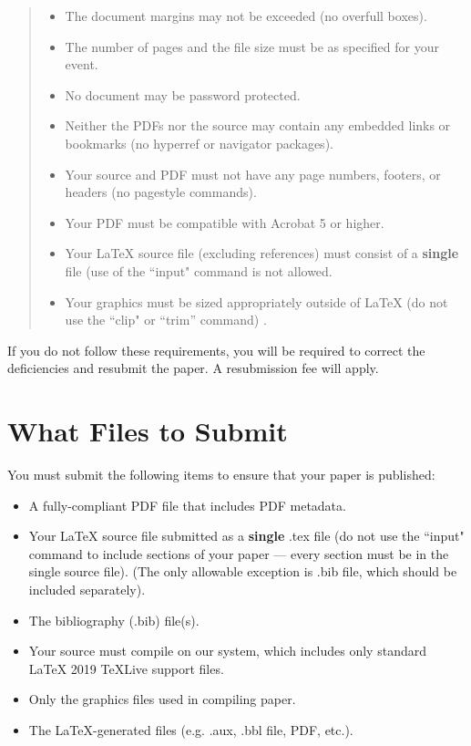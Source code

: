 \documentclass[letterpaper]{article} %
\begin{document}
\begin{quote}
\begin{itemize}
\item The document margins may not be exceeded (no overfull boxes).
\item The number of pages and the file size must be as specified for your event.
\item No document may be password protected.
\item Neither the PDFs nor the source may contain any embedded links or bookmarks (no hyperref or navigator packages).
\item Your source and PDF must not have any page numbers, footers, or headers (no pagestyle commands).
\item Your PDF must be compatible with Acrobat 5 or higher.
\item Your \LaTeX{} source file (excluding references) must consist of a \textbf{single} file (use of the ``input" command is not allowed.
\item Your graphics must be sized appropriately outside of \LaTeX{} (do not use the ``clip" or ``trim'' command) .
\end{itemize}
\end{quote}

If you do not follow these requirements, you will be required to correct the deficiencies and resubmit the paper. A resubmission fee will apply.

\section{What Files to Submit}
You must submit the following items to ensure that your paper is published:
\begin{itemize}
\item A fully-compliant PDF file that includes PDF metadata.
\item Your \LaTeX{} source file submitted as a \textbf{single} .tex file (do not use the ``input" command to include sections of your paper --- every section must be in the single source file). (The only allowable exception is .bib file, which should be included separately). 
\item The bibliography (.bib) file(s).
\item Your source must compile on our system, which includes only standard \LaTeX{} 2019 TeXLive support files. 
\item Only the graphics files used in compiling paper.
\item The \LaTeX{}-generated files (e.g. .aux,  .bbl file, PDF, etc.).
\end{itemize}
\end{document}
